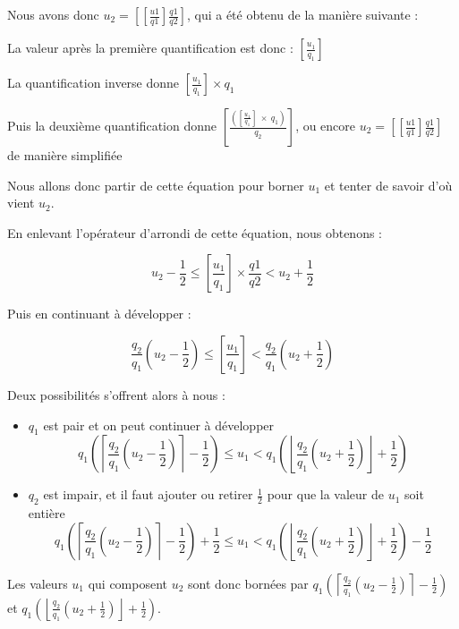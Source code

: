 \documentclass[utf8,final]{stageM2R} %
\begin{document}
Nous avons donc $u_2 = \left [ \left [ \frac{u1}{q1} \right ] \frac{q1}{q2}\right ]$, qui a été obtenu de la manière suivante : 

La valeur après la première quantification est donc : $\left [ \frac{u_1}{q_1} \right ]$

La quantification inverse donne $\left [ \frac{u_1}{q_1} \right ] \times  q_1$

Puis la deuxième quantification donne $\left [ \frac{\left (  \left [ \frac{u_1}{q_1} \right ]\ \times\  q_1 \right )}{q_2} \right ]$, ou encore $u_2 = \left [ \left [ \frac{u1}{q1} \right ] \frac{q1}{q2}\right ]$ de manière simplifiée

 Nous allons donc partir de cette équation pour borner $u_1$ et tenter de savoir d'où vient $u_2$.

En enlevant l'opérateur d'arrondi de cette équation, nous obtenons : 

$$ u_2 - \frac{1}{2} \leq \left [ \frac{u_1}{q_1} \right ] \times \frac{q1}{q2} < u_2 + \frac{1}{2} $$

Puis en continuant à développer : 

$$\frac{q_2}{q_1} \left (  u_2 - \frac{1}{2}\right ) \leq \left [ \frac{u_1}{q_1} \right ] < \frac{q_2}{q_1}  \left (u_2 + \frac{1}{2} \right)$$

Deux possibilités s'offrent alors à nous : 
\begin{itemize}
  \item $q_1$ est pair et on peut continuer à développer
     $$q_1\left(\left \lceil \frac{q_2}{q_1} \left (  u_2 - \frac{1}{2}\right ) \right \rceil - \frac{1}{2} \right) \leq u_1 < q_1\left(\left \lfloor \frac{q_2}{q_1} \left (  u_2 + \frac{1}{2}\right ) \right \rfloor + \frac{1}{2} \right)$$

   \item $q_2$ est impair, et il faut ajouter ou retirer $\frac{1}{2}$ pour que la valeur de $u_1$ soit entière
       $$q_1\left(\left \lceil \frac{q_2}{q_1} \left (  u_2 - \frac{1}{2}\right ) \right \rceil - \frac{1}{2} \right) + \frac{1}{2} \leq u_1 < q_1\left(\left \lfloor \frac{q_2}{q_1} \left (  u_2 + \frac{1}{2}\right ) \right \rfloor + \frac{1}{2} \right) - \frac{1}{2}$$

\end{itemize}

Les valeurs $u_1$ qui composent $u_2$ sont donc bornées par $q_1\left(\left \lceil \frac{q_2}{q_1} \left (  u_2 - \frac{1}{2}\right ) \right \rceil - \frac{1}{2} \right)$ et $q_1\left(\left \lfloor \frac{q_2}{q_1} \left (  u_2 + \frac{1}{2}\right ) \right \rfloor + \frac{1}{2} \right)$. 
\end{document}
